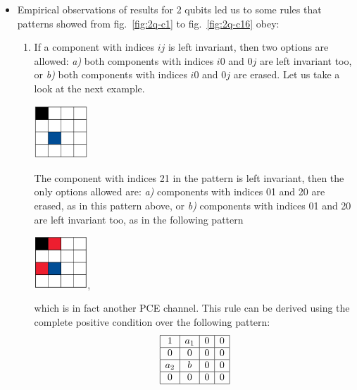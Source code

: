 \documentclass[11pt,dvipsnames]{article} %
\newcommand{\fref}[1]{fig.~\ref{#1}}  \newcommand{\tref}[1]{table~\ref{#1}}
\newcommand{\1}{\mathds{1}}
\begin{document}
\begin{itemize}
\item Empirical observations of results for 2 qubits 
led us to some rules that 
patterns showed from \fref{fig:2q-c1} to \fref{fig:2q-c16} obey:
\begin{enumerate}
\item If a component with indices $ij$ is left invariant, then two options are
allowed: \textit{a)} both components with indices $i0$ and $0j$ are left
invariant too, or \textit{b)} both components with indices $i0$ and $0j$ are
erased.
Let us take a look at the next example. 
\begin{center}
\includegraphics[width=2cm]{img/ex-2q2c-empiricalRule}
\end{center}
The component with indices 21 in the pattern is left invariant,
then the only options allowed are: \textit{a)} components with indices 01 and
20 are erased, as in this pattern above, or \textit{b)} components 
with indices 01 and 20 are left invariant too, 
as in the following pattern 
\begin{center}
\includegraphics[width=2cm]{img/ex-2q4c-empiricalRule},
\end{center}
which is in fact another PCE channel. This rule can be derived using the complete positive condition over the following pattern:
\begin{equation}
\begin{array}{|c|c|c|c|}
\hline
1 & a_1 & 0 & 0 \\ 
\hline
0 & 0 & 0 & 0 \\ 
\hline
a_2 & b & 0 & 0 \\ 
\hline
0 & 0 & 0 & 0\\
\hline
\end{array}
\end{equation}


\end{enumerate}
\end{itemize}
\end{document}
